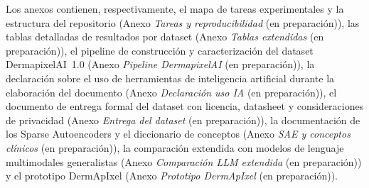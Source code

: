 Los anexos contienen, respectivamente, el mapa de tareas
experimentales y la estructura del repositorio
(Anexo \emph{Tareas y reproducibilidad} (en preparación)), las tablas detalladas de resultados por
dataset (Anexo \emph{Tablas extendidas} (en preparación)), el pipeline de construcción y
caracterización del dataset DermapixelAI~1.0
(Anexo \emph{Pipeline DermapixelAI} (en preparación)), la declaración sobre el uso de
herramientas de inteligencia artificial durante la elaboración del
documento (Anexo \emph{Declaración uso IA} (en preparación)), el documento de entrega formal
del dataset con licencia, datasheet y consideraciones de privacidad
(Anexo \emph{Entrega del dataset} (en preparación)), la documentación de los Sparse
Autoencoders y el diccionario de conceptos
(Anexo \emph{SAE y conceptos clínicos} (en preparación)), la comparación extendida con modelos
de lenguaje multimodales generalistas (Anexo \emph{Comparación LLM extendida} (en preparación)) y
el prototipo DermApIxel (Anexo \emph{Prototipo DermApIxel} (en preparación)).
